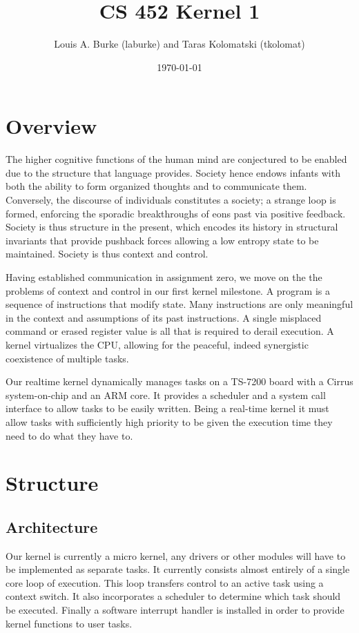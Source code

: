 \documentclass{article}
\title{CS 452 Kernel 1}
\author{Louis A. Burke (laburke) and Taras Kolomatski (tkolomat)}
\date{\today}
\begin{document}
\begingroup
\let\newpage\relax%
\maketitle
\endgroup

\section{Overview}

The higher cognitive functions of the human mind are conjectured to be enabled
due to the structure that language provides. Society hence endows infants with
both the ability to form organized thoughts and to communicate them.
Conversely, the discourse of individuals constitutes a society; a strange loop
is formed, enforcing the sporadic breakthroughs of eons past via positive
feedback. Society is thus structure in the present, which encodes its history in
structural invariants that provide pushback forces allowing a low entropy state
to be maintained. Society is thus context and control.

Having established communication in assignment zero, we move on the the problems
of context and control in our first kernel milestone. A program is a sequence of
instructions that modify state. Many instructions are only meaningful in the
context and assumptions of its past instructions. A single misplaced command or
erased register value is all that is required to derail execution. A kernel
virtualizes the CPU, allowing for the peaceful, indeed synergistic coexistence
of multiple tasks.

Our realtime kernel dynamically manages tasks on a TS-7200 board with a Cirrus
system-on-chip and an ARM core. It provides a scheduler and a system call
interface to allow tasks to be easily written. Being a real-time kernel it must
allow tasks with sufficiently high priority to be given the execution time they
need to do what they have to.

\section{Structure}

\subsection{Architecture}

Our kernel is currently a micro kernel, any drivers or other modules will have
to be implemented as separate tasks. It currently consists almost entirely of a
single core loop of execution. This loop transfers control to an active task
using a context switch. It also incorporates a scheduler to determine which task
should be executed. Finally a software interrupt handler is installed in order
to provide kernel functions to user tasks.
\end{document}

